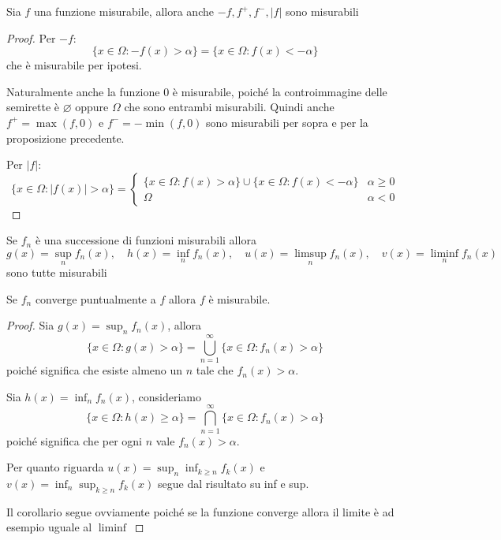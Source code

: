 \begin{proposition}
    Sia \(f\) una funzione misurabile, allora anche \(-f, f^{+}, f^{-}, |f|\)
    sono misurabili
\end{proposition}
\begin{proof}
    Per \(-f\):
    \[
        \{x \in \Omega : -f(x) > \alpha\} = \{x \in \Omega : f(x) < -\alpha\}
    \]
    che è misurabile per ipotesi.

    Naturalmente anche la funzione \(0\) è misurabile, poiché la controimmagine
    delle semirette è \(\varnothing\) oppure \(\Omega\) che sono entrambi
    misurabili. Quindi anche \(f^{+} = \max(f, 0)\) e \(f^{-} = -\min(f, 0)\)
    sono misurabili per sopra e per la proposizione precedente.

    Per \(|f|\):
    \[
    \{x \in \Omega: |f(x)| > \alpha\}  = \begin{cases}
        \{x \in \Omega : f(x) > \alpha\} \cup \{x \in \Omega : f(x) < -\alpha\}
        & \alpha \ge  0 \\
        \Omega & \alpha < 0
    \end{cases}
    \]
\end{proof}

\begin{proposition}
    Se \(f_{n}\) è una successione di funzioni misurabili allora
    \[g(x)=\sup_{n}f_{n}(x), \quad h(x)=\inf_{n}f_{n}(x),\quad
        u(x)=\limsup_{n}f_{n}(x),\quad
    v(x)=\liminf_{n}f_{n}(x)\] sono tutte misurabili
\end{proposition}
\begin{corollary}
    Se \(f_{n}\) converge puntualmente a \(f\) allora \(f\) è misurabile.
\end{corollary}
\begin{proof}
    Sia \(g(x) = \sup_n f_{n}(x)\), allora
    \[
        \{x \in \Omega : g(x) > \alpha\} = \bigcup_{n=1}^{\infty} \{x \in \Omega
        : f_{n}(x) > \alpha\}
    \]
    poiché significa che esiste almeno un \(n\) tale che \(f_{n}(x) > \alpha\). 

    Sia \(h(x) = \inf_{n} f_{n}(x)\), consideriamo
    \[
        \{x \in \Omega : h(x) \ge \alpha\} = \bigcap_{n=1}^{\infty} \{x \in
        \Omega : f_{n}(x) > \alpha\}
    \]
    poiché significa che per ogni \(n\) vale \(f_{n}(x) > \alpha\).

    Per quanto riguarda \(u(x) = \sup_n \inf_{k \ge n} f_k(x)\) e \(v(x) =
    \inf_n \sup_{k \ge n} f_k(x)\) segue dal risultato su inf e sup. 

    Il corollario segue ovviamente poiché se la funzione converge allora il
    limite è ad esempio uguale al \(\liminf\) 
\end{proof}

